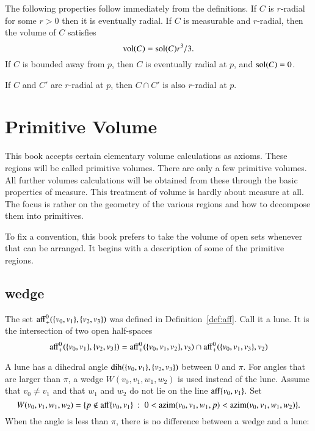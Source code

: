 The following properties follow immediately from the definitions.
If $C$ is $r$-radial for some $r>0$ then it is eventually radial.
If $C$ is measurable and $r$-radial, then the volume of $C$
satisfies
    $$
    {\operatorname{vol}}(C) = {\operatorname{sol}}(C) r^3/3.
    $$
If $C$ is bounded away from $p$, then $C$ is eventually radial at
$p$, and ${\operatorname{sol}}(C) = 0$.

\begin{lemma}  If $C$ and $C'$ are  $r$-radial
at $p$, then $C\cap C'$ is also $r$-radial at
$p$.
\end{lemma}






\section{Primitive Volume}

This book accepts
certain elementary volume calculations as axioms.  
These regions will be called primitive volumes.  There are only
a few primitive volumes.
All further
volumes calculations will be obtained from these through the basic
properties of measure.   
This treatment of volume is hardly about measure at all.  The focus is rather on the geometry of the various regions and how to decompose them into primitives.

To fix a convention, this book prefers to take the volume of open sets whenever that can be arranged.  It begins with a description of some of the primitive regions.

\subsection{wedge}


The set ${\operatorname{aff}}^0_+(\{v_0,v_1\},\{v_2,v_3\})$ was defined
in Definition~\ref{def:aff}.  Call it a lune.  It is the intersection
of two open half-spaces
    $$
    {\operatorname{aff}}^0_+(\{v_0,v_1\},\{v_2,v_3\})
    ={\operatorname{aff}}^0_+(\{v_0,v_1,v_2\},v_3)\cap
    {\operatorname{aff}}^0_+(\{v_0,v_1,v_3\},v_2)
    $$


A lune has a dihedral angle $\operatorname{dih}(\{v_0,v_1\},\{v_2,v_3\})$ between
$0$ and $\pi$.   For angles that are larger than $\pi$,   a wedge
$W(v_0,v_1,w_1,w_2)$ is used instead of the lune.  Assume that $v_0\ne v_1$ and that
$w_1$ and $w_2$ do not lie on
the line ${\operatorname{aff}}\{v_0,v_1\}$.  Set
$$
W(v_0,v_1,w_1,w_2) = 
  \{p\not\in{\operatorname{aff}}\{v_0,v_1\} \ :\  
  0< {\operatorname{azim}}(v_0,v_1,w_1,p) < {\operatorname{azim}}(v_0,v_1,w_1,w_2)\}.
$$
When the angle is less than $\pi$, there is no difference between
a wedge and a lune:

